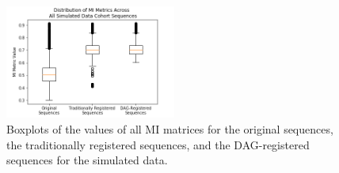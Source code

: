 \clearpage

\begin{figure}
\centering
\includegraphics[width=0.5\textwidth]{6/figures/spectr-mi-box.png}
\caption{Boxplots of the values of all MI matrices for the original sequences, the traditionally registered sequences, and the DAG-registered sequences for the simulated data.}
\label{fig:spectr-mi-box}
\end{figure}

